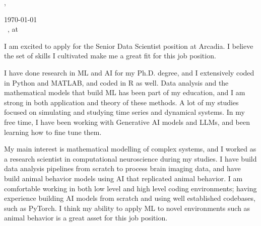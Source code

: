 \documentclass[12pt]{letter}
\begin{document}
\AddToShipoutPictureBG{%
  \color{gr}
  \AtPageUpperLeft{\rule[-1.3in]{\paperwidth}{1.3in}}
}

\begin{center}
  {\fontsize{28}{0}\selectfont\scshape \myname, \mytitle} \\
  \vspace{0.1in}
  \href{mailto:\myemail}{\faEnvelope\enspace \myemail}\hfill
  \href{https://linkedin.com/in/\mylinkedin}{\faLinkedinIn\enspace\mylinkedin}\hfill
  \href{tel:\myphone}{\faPhone\enspace \myphone}\hfill
  \faMapMarker\enspace \mylocation
\end{center}

\vspace{0.2in}

\today\vspace{0.1in}\\

\vspace{-0.1in}\greeting\ \recipient, at \company \\

\vspace{-0.1in}\setlength\parindent{24pt}
\noindent

I am excited to apply for the Senior Data Scientist position at Arcadia.
I believe the set of skills I cultivated make me a great fit for this
job position.

I have done research in ML and AI for my Ph.D. degree, and I
extensively coded in Python and MATLAB, and coded in R as well.
Data analysis and the mathematical models that build ML has been part
of my education, and I am strong in both application and theory of
these methods.
A lot of my studies focused on simulating and studying time series
and dynamical systems.
In my free time, I have been working with Generative AI models and
LLMs, and been learning how to fine tune them.

My main interest is mathematical modelling of complex systems,
and I worked as a research scientist in computational neuroscience
during my studies.
I have build data analysis pipelines from scratch to process brain imaging data,
and have build animal behavior models using AI that replicated animal behavior.
I am comfortable working in both low level and high level coding environments;
having experience building AI models from scratch and using well
established codebases, such as PyTorch.
I think my ability to apply ML to novel environments such as animal
behavior is a great asset for this job position.
\end{document}
